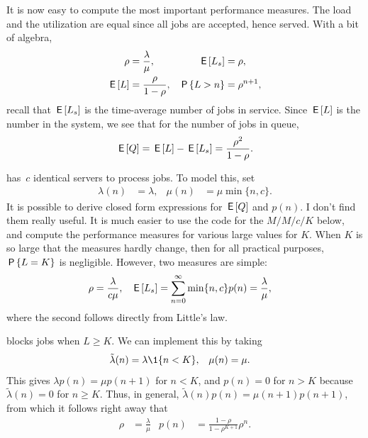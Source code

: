 \documentclass[queueing-book.tex]{subfiles}
\begin{document}
It is now easy to compute the most important performance measures.
The load and the utilization are equal since all jobs are accepted, hence served.  With a bit of algebra,
\begin{align}\label{eq:el}
\rho &= \frac{\lambda}{\mu}, & \E{\Ls} &= \rho, \\
  \E \L &= \frac \rho{1-\rho}, & \P{\L> n} &= \rho^{n+1},
\end{align}
recall that $\E\Ls$ is the time-average number of jobs in service. Since $\E\L$ is the number in the system, we see that for the number of jobs in queue,
\begin{equation*}
\E \QQ = \E \L - \E{\Ls} = \frac{\rho^2}{1-\rho}.
\end{equation*}



 has~$c$ identical servers to process jobs.
To model this, set
\begin{align*}
\lambda(n) &= \lambda, & \mu(n) &= \mu \min\{n, c\}.
\end{align*}
It is possible to derive closed form expressions for $\E \QQ$ and $p(n)$.
I don't find them really useful.
It is much easier to use the code for the $M/M/c/K$ below, and compute the performance measures for various large values for $K$.
When $K$ is so large that the measures hardly change, then for all practical purposes, $\P{L=K}$ is negligible.
However, two measures are simple:
\begin{align*}
  \rho & = \frac{\lambda}{ c\mu}, & \E{\Ls} &= \sum_{n=0}^{\infty}\min\{n,c\} p(n)= \frac{\lambda}\mu,
\end{align*}
where the second follows directly from Little's law.



 blocks jobs when $L\geq K$.
We can implement this by taking
\begin{align*}
\tilde \lambda(n) &= \lambda \1{n < K}, & \mu(n) &= \mu.
\end{align*}
This gives $\lambda p(n) = \mu p(n+1)$ for $n<K$, and $p(n) = 0$ for $n>K$ because $\tilde \lambda(n) = 0$ for $n\geq K$.
Thus, in general, $\tilde \lambda(n) p(n) = \mu(n+1)p(n+1)$, from which it follows right away that
 \begin{align*}
\rho &= \frac{\lambda}{\mu} & p(n) &= \frac{1-\rho}{1-\rho^{K+1}} \rho^n.
\end{align*}
\end{document}

